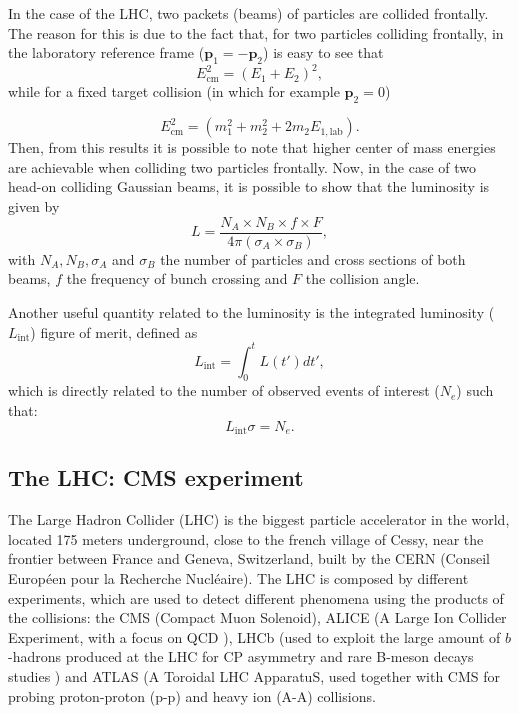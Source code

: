 In the case of the LHC, two packets (beams) of particles are collided frontally. The reason for this is due to the fact that, for two particles colliding frontally, in the laboratory reference frame ($\bm{p}_1 = -\bm{p}_2$) is easy to see that
\begin{equation*}
    E_{\textrm{cm}}^2 = (E_1 + E_2)^2,
\end{equation*}
while for a fixed target collision (in which for example $\bm{p}_2 = 0$)

 \begin{equation*}
    E_{\textrm{cm}}^2 = (m_1^2 + m_2^2 + 2m_2E_{1,\textrm{lab}}).
 \end{equation*}
 Then, from this results it is possible to note that higher center of mass energies are achievable when colliding two particles frontally. Now, in the case of two head-on colliding Gaussian beams, it is possible to show that the luminosity is given by \cite{luminosity}
 \begin{equation*}
     L = \dfrac{N_A \times N_B \times f \times F}{4\pi(\sigma_A \times \sigma_B)},
 \end{equation*}
 with $N_A, N_B, \sigma_A$ and $\sigma_B$ the number of particles and cross sections of both beams, $f$ the frequency of bunch crossing and $F$ the collision angle.
 
 Another useful quantity related to the luminosity is the integrated luminosity ($L_{\textrm{int}}$) figure of merit, defined as
 \begin{equation*}
     L_{\textrm{int}} = \int_0^t L(t')dt',
 \end{equation*}
 which is directly related to the number of observed events of interest ($N_e$) such that:
 \begin{equation*}
     L_{\textrm{int}}\sigma = N_e.
 \end{equation*}
 
\subsection{The LHC: CMS experiment} \label{ssec:LHC}

The Large Hadron Collider (LHC) is the biggest particle accelerator in the world, located 175 meters underground, close to the french village of Cessy, near the frontier between France and Geneva, Switzerland, built by the CERN (Conseil Européen pour la Recherche Nucléaire). The LHC is composed by different experiments, which are used to detect different phenomena using the products of the collisions: the CMS (Compact Muon Solenoid), ALICE (A Large Ion Collider Experiment, with a focus on QCD \cite{ALICE}), LHCb (used to exploit the large amount of $b$-hadrons produced at the LHC for CP asymmetry and rare B-meson decays studies \cite{LHCb}) and ATLAS (A Toroidal LHC ApparatuS, used together with CMS for probing proton-proton (p-p) and heavy ion (A-A) collisions.


